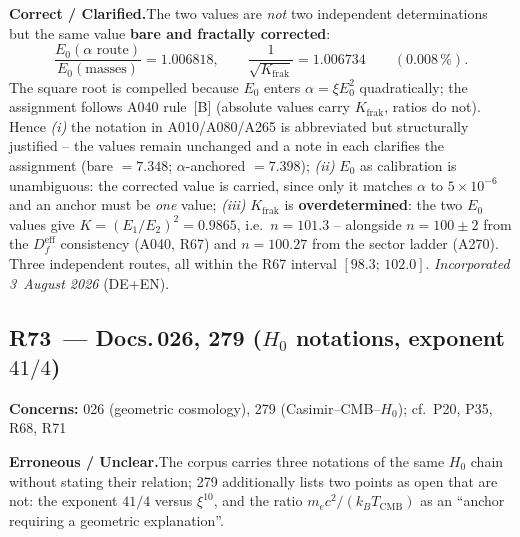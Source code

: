 \smallskip\noindent\textbf{Correct / Clarified.}\quad The two values are
\emph{not} two independent determinations but the same value
\textbf{bare and fractally corrected}:
\[
  \frac{E_0(\alpha\text{ route})}{E_0(\text{masses})}
  = 1.006818,
  \qquad
  \frac{1}{\sqrt{K_\text{frak}}} = 1.006734
  \qquad (0.008\,\%).
\]
The square root is compelled because $E_0$ enters $\alpha = \xi E_0^2$
quadratically; the assignment follows A040 rule~[B] (absolute values
carry $K_\text{frak}$, ratios do not). Hence \emph{(i)} the notation in
A010/A080/A265 is abbreviated but structurally justified -- the values
remain unchanged and a note in each clarifies the assignment (bare
$= 7.348$; $\alpha$-anchored $= 7.398$); \emph{(ii)} $E_0$ as
calibration is unambiguous: the corrected value is carried, since only
it matches $\alpha$ to $5\times10^{-6}$ and an anchor must be \emph{one}
value; \emph{(iii)} $K_\text{frak}$ is \textbf{overdetermined}: the two
$E_0$ values give $K = (E_1/E_2)^2 = 0.9865$, i.e.\ $n = 101.3$ --
alongside $n = 100\pm2$ from the $D_f^\text{eff}$ consistency (A040,
R67) and $n = 100.27$ from the sector ladder (A270). Three independent
routes, all within the R67 interval $[98.3;\,102.0]$.
\emph{Incorporated 3~August 2026} (DE+EN).

\medskip

\subsection*{R73~--- Docs.\,026, 279 ($H_0$ notations, exponent $41/4$)}

\noindent\textbf{Concerns:} 026 (geometric cosmology), 279
(Casimir--CMB--$H_0$); cf.\ P20, P35, R68, R71

\smallskip\noindent\textbf{Erroneous / Unclear.}\quad The corpus carries
three notations of the same $H_0$ chain without stating their relation;
279 additionally lists two points as open that are not: the exponent
$41/4$ versus $\xi^{10}$, and the ratio $m_ec^2/(k_BT_\text{CMB})$ as an
\enquote{anchor requiring a geometric explanation}.

